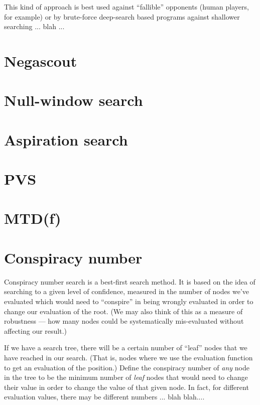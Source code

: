 \documentclass[10pt,dvipdfmx]{report}
\begin{document}
This kind of approach is best used against ``fallible'' opponents (human players, for example)
or by brute-force deep-search based programs against shallower searching ... blah ...

\section{Negascout}
\section{Null-window search}
\section{Aspiration search}
\section{PVS}
\section{MTD(f)}

\section{Conspiracy number}
Conspiracy number search is a best-first search method.
It is based on the idea of searching to a given level of confidence, measured
in the number of nodes we've evaluated which would need to ``conspire'' in being
wrongly evaluated in order to change our evaluation of the root.  (We may also think
of this as a measure of robustness --- how many nodes could be systematically mis-evaluated
without affecting our result.)

If we have a search tree, there will be a certain
number of ``leaf'' nodes that we have reached in our search.  (That is,
nodes where we use the evaluation function to get an evaluation of the position.)
Define the conspiracy number of {\em any} node in the tree to be the minimum number
of {\em leaf} nodes that would need to change their value in order to
change the value of that given node.  In fact, for different evaluation values, there
may be different numbers ... blah blah....
\end{document}
